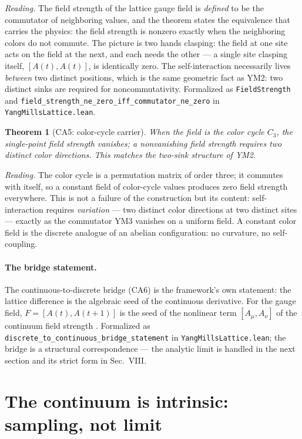 \documentclass[aps,prd,preprint,superscriptaddress,amsmath,amssymb]{revtex4-2}
\newtheorem{theorem}{Theorem}[section]
\begin{document}
\emph{Reading.}  The field strength of the lattice gauge field is
\emph{defined} to be the commutator of neighboring values, and the
theorem states the equivalence that carries the physics: the field
strength is nonzero exactly when the neighboring colors do not
commute.  The picture is two hands clasping: the field at one site
acts on the field at the next, and each needs the other --- a single
site clasping itself, $[A(t),A(t)]$, is identically zero.  The
self-interaction necessarily lives \emph{between} two distinct
positions, which is the same geometric fact as YM2: two distinct
sinks are required for noncommutativity.  Formalized as
\texttt{FieldStrength} and
\texttt{field\_strength\_ne\_zero\_iff\_commutator\_ne\_zero} in
\texttt{YangMillsLattice.lean}.

\begin{theorem}[CA5: color-cycle carrier]
\label{thm:ca5}
When the field is the color cycle $C_3$, the single-point field
strength vanishes; a nonvanishing field strength requires two
distinct color directions.  This matches the two-sink structure of
YM2.
\end{theorem}

\emph{Reading.}  The color cycle is a permutation matrix of order
three; it commutes with itself, so a constant field of color-cycle
values produces zero field strength everywhere.  This is not a
failure of the construction but its content: self-interaction
requires \emph{variation} --- two distinct color directions at two
distinct sites --- exactly as the commutator YM3 vanishes on a
uniform field.  A constant color field is the discrete analogue of
an abelian configuration: no curvature, no self-coupling.

\paragraph{The bridge statement.}
The continuous-to-discrete bridge (CA6) is the framework's own
statement: the lattice difference is the algebraic seed of the
continuous derivative.  For the gauge field, $F=[A(t),A(t{+}1)]$ is
the seed of the nonlinear term $[A_\mu,A_\nu]$ of the continuum
field strength \cite{yang1954conservation,peskin1995introduction}.
Formalized as \texttt{discrete\_to\_continuous\_bridge\_statement}
in \texttt{YangMillsLattice.lean}; the bridge is a structural
correspondence --- the analytic limit is handled in the next section
and its strict form in Sec.~VIII.

\section{The continuum is intrinsic: sampling, not limit}
\label{sec:intrinsic}
\end{document}
